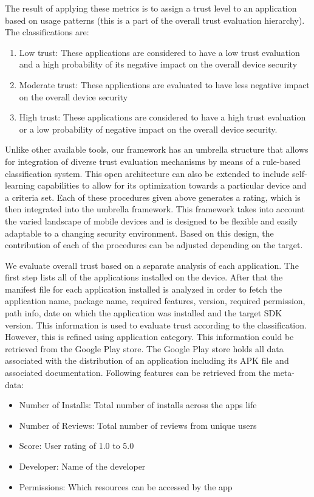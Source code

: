 The result of applying these metrics is to assign a trust level to an application based on usage patterns (this is a part of the
overall trust evaluation hierarchy).
The classifications are: 
\begin{enumerate}
  \item Low trust: These applications are considered to have
a low trust evaluation and a high probability of its negative
impact on the overall device security
  \item Moderate trust: These applications are evaluated to have
less negative  impact on the overall device security
  \item High trust: These applications are considered to have a high
trust evaluation or a low probability of  negative impact
on the overall device security.
\end{enumerate}


Unlike other available tools, our framework has an umbrella structure that allows for integration of 
diverse trust evaluation mechanisms by means of a rule-based classification system.
This open architecture can also be extended to include 
 self-learning capabilities to allow for its optimization towards a particular device and a criteria set. Each of these procedures given above generates a rating, which is then integrated into the umbrella framework. This framework takes into account the varied landscape of mobile devices and is designed to be flexible and easily adaptable to a changing security environment. 
Based on this design, the contribution of each of the procedures can be adjusted depending on the target.


We evaluate overall trust based on a separate
analysis of each application. The first step lists all of the
applications installed on the device. After that the
manifest file for each application installed is analyzed in order to
fetch the application name, package name, required features,
version, required permission, path info, date on which the
application was installed and the target SDK version. This
information is used to evaluate  trust according to the classification.
However, this is refined using
application category. This information could
be retrieved from the Google Play store. The Google Play store
holds all data associated with the distribution of an application
including its APK file and associated documentation.  Following
features can be retrieved from the
meta-data:
\begin{itemize}
  \item Number of Installs: Total number of installs across the apps life
  \item Number of Reviews: Total number of reviews from unique users
  \item Score: User rating of 1.0 to 5.0
  \item Developer: Name of the developer
  \item Permissions: Which resources can be accessed by the app
\end{itemize}

